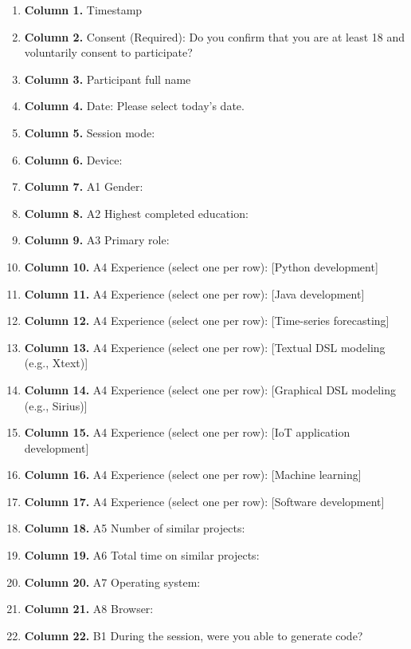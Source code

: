 \begin{enumerate}[leftmargin=*]
    \item \textbf{Column 1.} Timestamp
    \item \textbf{Column 2.} Consent (Required): Do you confirm that you are at least 18 and voluntarily consent to participate?
    \item \textbf{Column 3.} Participant full name 
    \item \textbf{Column 4.} Date: Please select today's date.
    \item \textbf{Column 5.} Session mode:
    \item \textbf{Column 6.} Device:
    \item \textbf{Column 7.} A1 Gender:
    \item \textbf{Column 8.} A2 Highest completed education:
    \item \textbf{Column 9.} A3 Primary role:
    \item \textbf{Column 10.} A4 Experience (select one per row): [Python development]
    \item \textbf{Column 11.} A4 Experience (select one per row): [Java development]
    \item \textbf{Column 12.} A4 Experience (select one per row): [Time-series forecasting]
    \item \textbf{Column 13.} A4 Experience (select one per row): [Textual DSL modeling (e.g., Xtext)]
    \item \textbf{Column 14.} A4 Experience (select one per row): [Graphical DSL modeling (e.g., Sirius)]
    \item \textbf{Column 15.} A4 Experience (select one per row): [IoT application development]
    \item \textbf{Column 16.} A4 Experience (select one per row): [Machine learning]
    \item \textbf{Column 17.} A4 Experience (select one per row): [Software development]
    \item \textbf{Column 18.} A5 Number of similar projects:
    \item \textbf{Column 19.} A6 Total time on similar projects:
    \item \textbf{Column 20.} A7 Operating system:
    \item \textbf{Column 21.} A8 Browser:
    \item \textbf{Column 22.} B1 During the session, were you able to generate code?

\end{enumerate}
